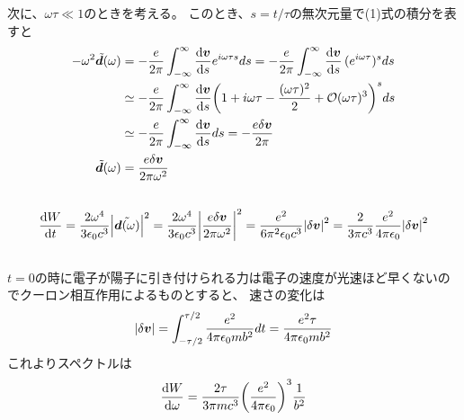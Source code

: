 \documentclass[../../sp_2017.tex]{subfiles}
\begin{document}
次に、\(\omega\tau \ll 1\)のときを考える。
このとき、\(s = t/\tau\)の無次元量で(1)式の積分を表すと
\begin{equation}\begin{aligned}[b]
    -\omega^2\tilde{\vb*{d}}(\omega)
        &= -\frac{e}{2\pi}\int_{-\infty}^\infty\dv{\vb*{v}}{s}e^{i\omega\tau s}ds
        = -\frac{e}{2\pi}\int_{-\infty}^\infty\dv{\vb*{v}}{s}\,(e^{i\omega\tau})^sds\\
        &\simeq -\frac{e}{2\pi}\int_{-\infty}^\infty\dv{\vb*{v}}{s}\qty(1+i\omega \tau -\frac{(\omega \tau)^2}{2}+\mathcal{O}(\omega\tau)^3)^sds\\
        &\simeq -\frac{e}{2\pi}\int_{-\infty}^\infty\dv{\vb*{v}}{s}ds
        =-\frac{e\delta \vb*{v}}{2\pi}\\
    \tilde{\vb*{d}}(\omega)
     &= \frac{e \delta\vb*{v}}{2\pi\omega^2}
\end{aligned}\end{equation}

\subsection{}
\begin{equation}\begin{aligned}[b]
    \dv{W}{t}
        = \frac{2\omega^4}{3\epsilon_0c^3}\abs{\tilde{\vb*{d}(\omega)}}^2
        = \frac{2\omega^4}{3\epsilon_0c^3}\abs{\frac{e \delta\vb*{v}}{2\pi\omega^2}}^2
        = \frac{e^2}{6\pi^2 \epsilon_0c^3}\abs{\delta \vb*{v}}^2
        = \frac{2}{3\pi c^3}\frac{e^2}{4\pi\epsilon_0}\abs{\delta \vb*{v}}^2
\end{aligned}\end{equation}

\subsection{}
\(t=0\)の時に電子が陽子に引き付けられる力は電子の速度が光速ほど早くないのでクーロン相互作用によるものとすると、
速さの変化は
\begin{equation}\begin{aligned}[b]
    \abs{\delta \vb*{v}} = \int_{-\tau/2}^{\tau/2} \frac{e^2}{4\pi\epsilon_0 mb^2} dt = \frac{e^2\tau}{4\pi\epsilon_0 mb^2}
\end{aligned}\end{equation}
これよりスペクトルは
\begin{equation}\begin{aligned}[b]
    \dv{W}{\omega} = \frac{2\tau}{3\pi mc^3}\qty(\frac{e^2}{4\pi\epsilon_0})^3\frac{1}{b^2}
\end{aligned}\end{equation}
\end{document}
